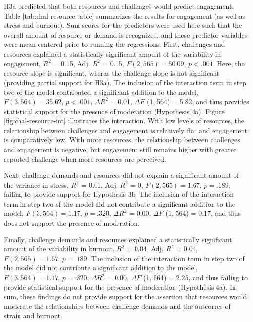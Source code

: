 \documentclass[
  man,mask]{apa7}
\begin{document}
H3a predicted that both resources and challenges would predict engagement. Table \ref{tab:chal-resource-table} summarizes the results for engagement (as well as stress and burnout). Sum scores for the predictors were used here such that the overall amount of resource or demand is recognized, and these predictor variables were mean centered prior to running the regressions. First, challenges and resources explained a statistically significant amount of the variability in engagement, \(R^2\) = 0.15, Adj. \(R^2\) = 0.15, \(F(2, 565) = 50.09\), \(p < .001\). Here, the resource slope is significant, wheras the challenge slope is not significant (providing partial support for H3a). The inclusion of the interaction term in step two of the model contributed a significant addition to the model, \(F(3, 564) = 35.62\), \(p < .001\), \(\Delta R^2\) = 0.01, \(\Delta F\) (1, 564) = 5.82, and thus provides statistical support for the presence of moderation (Hypothesis 4a). Figure \ref{fig:chal-resource-int} illustrates the interaction. With low levels of resources, the relationship between challenges and engagement is relatively flat and engagement is comparatively low. With more resources, the relationship between challenges and engagement is negative, but engagement still remains higher with greater reported challenge when more resources are perceived.

Next, challenge demands and resources did not explain a significant amount of the variance in stress, \(R^2\) = 0.01, Adj. \(R^2\) = 0, \(F(2, 565) = 1.67\), \(p = .189\), failing to provide support for Hypothesis 3b. The inclusion of the interaction term in step two of the model did not contribute a significant addition to the model, \(F(3, 564) = 1.17\), \(p = .320\), \(\Delta R^2\) = 0.00, \(\Delta F\) (1, 564) = 0.17, and thus does not support the presence of moderation.

Finally, challenge demands and resources explained a statistically significant amount of the variability in burnout, \(R^2\) = 0.04, Adj. \(R^2\) = 0.04, \(F(2, 565) = 1.67\), \(p = .189\). The inclusion of the interaction term in step two of the model did not contribute a significant addition to the model, \(F(3, 564) = 1.17\), \(p = .320\), \(\Delta R^2\) = 0.00, \(\Delta F\) (1, 564) = 2.25, and thus failing to provide statistical support for the presence of moderation (Hypothesis 4a). In sum, these findings do not provide support for the assertion that resources would moderate the relationships between challenge demands and the outcomes of strain and burnout.
\end{document}
